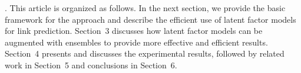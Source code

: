 . This article is organized as follows. In the next section, we  provide
the basic framework for the approach and describe the efficient use
of  latent factor models for link prediction. Section~3 discusses
how latent factor models can be augmented with ensembles to provide
more effective and efficient results. Section~4 presents and discusses the
experimental results, followed by related work in Section~5 and conclusions in Section~6.

